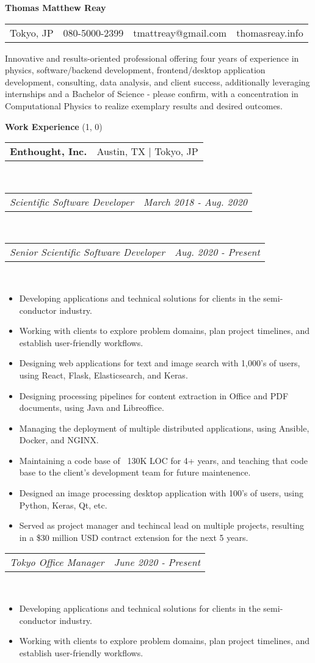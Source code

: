 \documentclass{article}
\makeatletter
\newcommand{\heading}[1]{
	\vspace{2em}
	\textbf{\large #1}
	\line(1, 0){\textwidth}
	\vspace{-0.5em}
}
\newcommand{\subheading}[2]{
	\begin{tabular*}{\textwidth}{l@{\extracolsep{\fill}}r}
		\textbf{#1} & #2 \\
	\end{tabular*} \\
}
\newcommand{\itemheading}[2]{
	\vspace{0.2em}
	\begin{tabular*}{\textwidth}{l@{\extracolsep{\fill}}r}
		\textit{#1} & \textit{#2} \\
	\end{tabular*} \\
	\vspace{-0.5em}
}
\makeatother
\begin{document}
\textbf{\huge Thomas Matthew Reay}

\vspace{1em}

\begin{tabular*}{\textwidth}{l|l|l|l}
	\hline
	Tokyo, JP & 080-5000-2399 & tmattreay@gmail.com & thomasreay.info
	\rule{0em}{1.25em} \\
\end{tabular*}

\vspace{1em}

Innovative and results-oriented professional offering four years of experience in physics, software/backend
development, frontend/desktop application development, consulting, data analysis, and client success,
additionally leveraging internships and a Bachelor of Science - please confirm, with a concentration in
Computational Physics to realize exemplary results and desired outcomes.

\heading{Work Experience}

\subheading{Enthought, Inc.}{Austin, TX | Tokyo, JP}
\itemheading{Scientific Software Developer}{March 2018 - Aug. 2020}
\vspace{0.5em}
\itemheading{Senior Scientific Software Developer}{Aug. 2020 - Present}
\begin{itemize}
	\item Developing applications and technical solutions for clients in the semi-conductor industry.
	\item Working with clients to explore problem domains, plan project timelines, and establish user-friendly workflows.
	\item Designing web applications for text and image search with 1,000's of users, using React, Flask, Elasticsearch, and Keras.
	\item Designing processing pipelines for content extraction in Office and PDF documents, using Java and Libreoffice.
	\item Managing the deployment of multiple distributed applications, using Ansible, Docker, and NGINX.
	\item Maintaining a code base of ~130K LOC for 4+ years, and teaching that code base to the client's development team for future maintenence.
	\item Designed an image processing desktop application with 100's of users, using Python, Keras, Qt, etc.
	\item Served as project manager and techincal lead on multiple projects, resulting in a \$30 million USD contract extension for the next 5 years.
\end{itemize}
\itemheading{Tokyo Office Manager}{June 2020 - Present}
\begin{itemize}
	\item Developing applications and technical solutions for clients in the semi-conductor industry.
	\item Working with clients to explore problem domains, plan project timelines, and establish user-friendly workflows.
\end{itemize}
\end{document}
